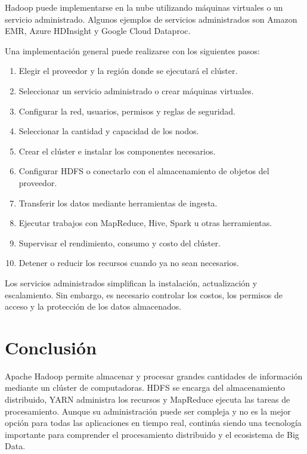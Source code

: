 Hadoop puede implementarse en la nube utilizando máquinas virtuales o un
servicio administrado. Algunos ejemplos de servicios administrados son Amazon
EMR, Azure HDInsight y Google Cloud Dataproc.

Una implementación general puede realizarse con los siguientes pasos:

\begin{enumerate}
    \item Elegir el proveedor y la región donde se ejecutará el clúster.
    \item Seleccionar un servicio administrado o crear máquinas virtuales.
    \item Configurar la red, usuarios, permisos y reglas de seguridad.
    \item Seleccionar la cantidad y capacidad de los nodos.
    \item Crear el clúster e instalar los componentes necesarios.
    \item Configurar HDFS o conectarlo con el almacenamiento de objetos del
    proveedor.
    \item Transferir los datos mediante herramientas de ingesta.
    \item Ejecutar trabajos con MapReduce, Hive, Spark u otras herramientas.
    \item Supervisar el rendimiento, consumo y costo del clúster.
    \item Detener o reducir los recursos cuando ya no sean necesarios.
\end{enumerate}

Los servicios administrados simplifican la instalación, actualización y
escalamiento. Sin embargo, es necesario controlar los costos, los permisos de
acceso y la protección de los datos almacenados.

\section{Conclusión}

Apache Hadoop permite almacenar y procesar grandes cantidades de información
mediante un clúster de computadoras. HDFS se encarga del almacenamiento
distribuido, YARN administra los recursos y MapReduce ejecuta las tareas de
procesamiento. Aunque su administración puede ser compleja y no es la mejor
opción para todas las aplicaciones en tiempo real, continúa siendo una
tecnología importante para comprender el procesamiento distribuido y el
ecosistema de Big Data.